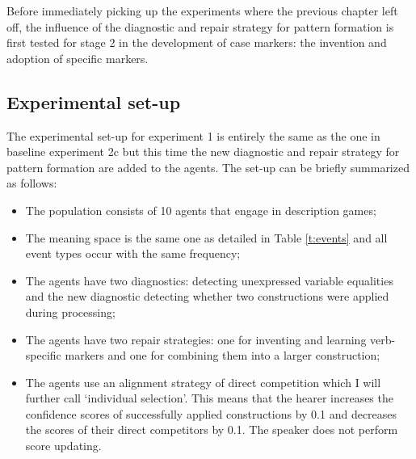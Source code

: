 Before immediately picking up the experiments where the previous chapter left off, the influence of the diagnostic and repair strategy for pattern formation is first tested for stage 2 in the development of case markers: the invention and adoption of specific markers.

\subsection{Experimental set-up}

The experimental set-up for experiment 1 is entirely the same as the one in baseline experiment 2c but this time the new diagnostic and repair strategy for pattern formation are added to the agents. The set-up can be briefly summarized as follows:

\begin{itemize}
\item The population consists of 10 agents that engage in description games;
\item The meaning space is the same one as detailed in Table \ref{t:events} and all event types occur with the same frequency;
\item The agents have two diagnostics: detecting unexpressed variable equalities and the new diagnostic detecting whether two constructions were applied during processing;
\item The agents have two repair strategies: one for inventing and learning verb-specific markers and one for combining them into a larger construction;
\item The agents use an alignment strategy of direct competition which I will further call `individual selection'. This means that the hearer increases the confidence scores of successfully applied constructions by 0.1 and decreases the scores of their direct competitors by 0.1. The speaker does not perform score updating.
\end{itemize}

